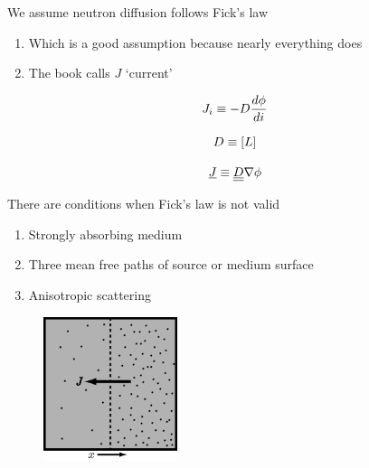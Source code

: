 \documentclass[aspectratio=1610,pdftex,dvipsnames,compress,xcolor={dvipsnames}]{beamer}
\begin{document}
\addtocounter{framenumber}{-1} 
\begin{frame}{We assume neutron diffusion follows Fick's law}
    \begin{enumerate}[series=outerlist,topsep=0pt,itemsep=21pt,leftmargin=*,label=(\arabic*)]
        \item[]Which is a good assumption because nearly everything does
        \item[]The book calls $J$ `current' 
    \end{enumerate}

    \vspace*{\fill}

    \begin{equation}
        \LARGE
        J_i \equiv -D \frac{d \phi}{di}
    \end{equation}

    \begin{equation}
        \LARGE
        D \equiv [L]
    \end{equation}

    \begin{equation}
        \LARGE
        \underline{J} \equiv \underline{\underline{D}} \nabla \phi
    \end{equation}
\end{frame}


\begin{frame}{There are conditions when Fick's law is not valid}
    \begin{enumerate}[series=outerlist,topsep=0pt,itemsep=21pt,leftmargin=*,label=(\arabic*)]
        \item[]Strongly absorbing medium
        \item[]Three mean free paths of source or medium surface
        \item[]Anisotropic scattering
    \end{enumerate}
\end{frame}


\begin{frame}{}
    \begin{figure}
        \centering
        \includegraphics[width=0.35\textwidth]{current.jpg}
    \end{figure}
\end{frame}
\end{document}
